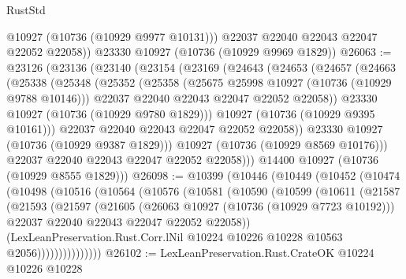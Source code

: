 \begin{lexlean}{RustStd}
\begin{coremodule}
          @10927
          (@10736 (@10929 @9977 @10131)))
        @22037
        @22040
        @22043
        @22047
        @22052
        @22058))
    @23330
    @10927
    (@10736 (@10929 @9969 @1829))
@26063 := @23126
    (@23136
      (@23140
        (@23154
          (@23169
            (@24643
              (@24653
                (@24657
                  (@24663
                    (@25338
                      (@25348
                        (@25352
                          (@25358
                            (@25675 @25998 @10927 (@10736 (@10929 @9788 @10146)))
                            @22037
                            @22040
                            @22043
                            @22047
                            @22052
                            @22058))
                        @23330
                        @10927
                        (@10736 (@10929 @9780 @1829)))
                      @10927
                      (@10736 (@10929 @9395 @10161)))
                    @22037
                    @22040
                    @22043
                    @22047
                    @22052
                    @22058))
                @23330
                @10927
                (@10736 (@10929 @9387 @1829)))
              @10927
              (@10736 (@10929 @8569 @10176)))
            @22037
            @22040
            @22043
            @22047
            @22052
            @22058)))
      @14400
      @10927
      (@10736 (@10929 @8555 @1829)))
@26098 := @10399
    (@10446
      (@10449
        (@10452
          (@10474
            (@10498
              (@10516
                (@10564
                  (@10576
                    (@10581
                      (@10590
                        (@10599
                          (@10611
                            (@21587
                              (@21593
                                (@21597
                                  (@21605
                                    (@26063 @10927 (@10736 (@10929 @7723 @10192)))
                                    @22037
                                    @22040
                                    @22043
                                    @22047
                                    @22052
                                    @22058))
                                (LexLeanPreservation.Rust.Corr.lNil
                                  @10224
                                  @10226
                                  @10228
                                  @10563
                                  @2056)))))))))))))))
@26102 := LexLeanPreservation.Rust.CrateOK @10224 @10226 @10228

\end{coremodule}
\end{lexlean}
